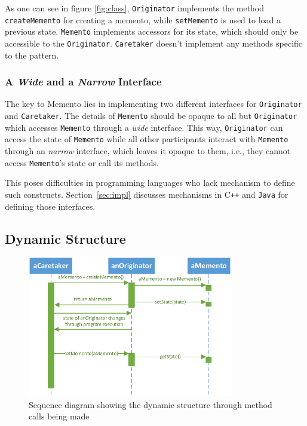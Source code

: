 \documentclass[11pt, a4paper, twoside]{article}
\def\cpp{C{}\texttt{++}}
\begin{document}
	As one can see in figure \ref{fig:class}, \verb|Originator| implements the method \verb|createMemento| for creating a memento, while \verb|setMemento| is used to load a previous state. \verb|Memento| implements accessors for its state, which should only be accessible to the \verb|Originator|. \verb|Caretaker| doesn't implement any methods specific to the pattern.
	
	\subsubsection{A \emph{Wide} and a \emph{Narrow} Interface}
	
	The key to Memento lies in implementing two different interfaces for \verb|Originator| and \verb|Caretaker|. The details of \verb|Memento| should be opaque to all but \verb|Originator| which accesses \verb|Memento| through a \emph{wide} interface. This way, \verb|Originator| can access the state  of \verb|Memento| while all other participants interact with \verb|Memento| through an \emph{narrow} interface, which leaves it opaque to them, i.e., they cannot access \verb|Memento|'s state or call its methods.
	
	This poses difficulties in programming languages who lack mechanism to define such constructs. Section~\ref{sec:impl} discusses mechanisms in \cpp{} and \verb|Java| for defining those interfaces.
	
	\subsection{Dynamic Structure}
	
	\begin{figure}[htb]
		\begin{center}
			\includegraphics[width=0.8\textwidth]{sequence_diagram.pdf}
			\caption{Sequence diagram showing the dynamic structure through method calls being made}
			\label{fig:sequence}
		\end{center}
	\end{figure}
	
\end{document}
